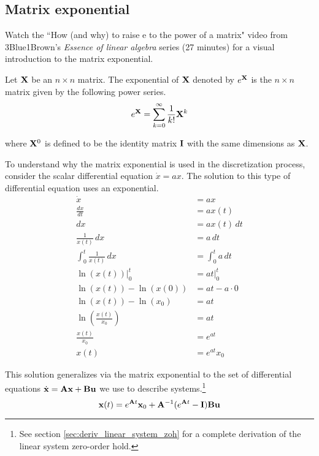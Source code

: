 \subsection{Matrix exponential}
\begin{remark}
  Watch the ``How (and why) to raise e to the power of a matrix" video from
  3Blue1Brown's \textit{Essence of linear algebra} series (27 minutes)
  \cite{bib:3b1b_linalg_matrix_exp} for a visual introduction to the matrix
  exponential.
\end{remark}
\begin{definition}
  Let $\mathbf{X}$ be an $n \times n$ matrix. The exponential of $\mathbf{X}$ denoted
  by $e^{\mathbf{X}}$ is the $n \times n$ matrix given by the following power
  series.
  \begin{equation}
    e^{\mathbf{X}} = \sum_{k=0}^\infty \frac{1}{k!} \mathbf{X}^k \label{eq:mat_exp}
  \end{equation}

  where $\mathbf{X}^0$ is defined to be the identity matrix $\mathbf{I}$ with the same
  dimensions as $\mathbf{X}$.
\end{definition}

To understand why the matrix exponential is used in the \gls{discretization}
process, consider the scalar differential equation $\dot{x} = ax$. The solution
to this type of differential equation uses an exponential.
\begin{align*}
  \dot{x} &= ax \\
  \frac{dx}{dt} &= ax(t) \\
  dx &= ax(t) \,dt \\
  \frac{1}{x(t)} \,dx &= a \,dt \\
  \int_0^t \frac{1}{x(t)} \,dx &= \int_0^t a \,dt \\
  \ln(x(t)) \rvert_0^t &= at \rvert_0^t \\
  \ln(x(t)) - \ln(x(0)) &= at - a \cdot 0 \\
  \ln(x(t)) - \ln(x_0) &= at \\
  \ln\left(\frac{x(t)}{x_0}\right) &= at \\
  \frac{x(t)}{x_0} &= e^{at} \\
  x(t) &= e^{at} x_0
\end{align*}

This solution generalizes via the matrix exponential to the set of differential
equations $\dot{\mathbf{x}} = \mathbf{A}\mathbf{x} + \mathbf{B}\mathbf{u}$ we use to describe
\glspl{system}.\footnote{See section \ref{sec:deriv_linear_system_zoh} for a
complete derivation of the linear system zero-order hold.}
\begin{equation*}
  \mathbf{x}(t) = e^{\mathbf{A}t} \mathbf{x}_0 +
    \mathbf{A}^{-1}(e^{\mathbf{A}t} - \mathbf{I})\mathbf{B} \mathbf{u}
\end{equation*}

